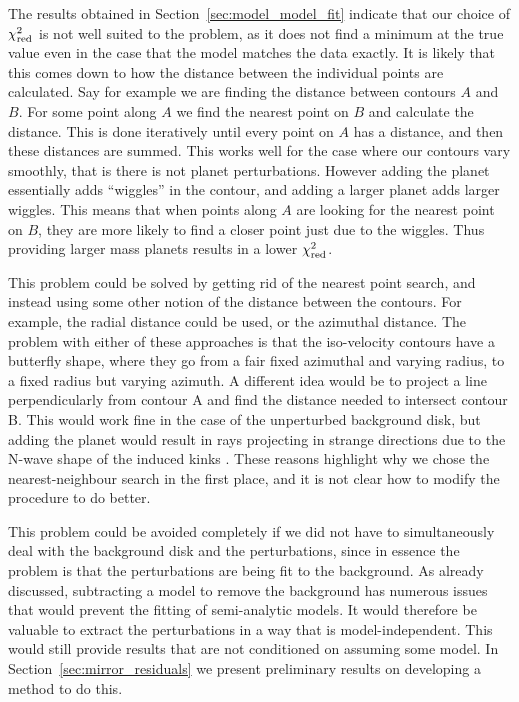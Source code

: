 The results obtained in Section~\ref{sec:model_model_fit} indicate that our choice of $\chi^2_{\rm red}$ is not well suited to the problem, as it does not find a minimum at the true value even in the case that the model matches the data exactly.
It is likely that this comes down to how the distance between the individual points are calculated.
Say for example we are finding the distance between contours $A$ and $B$.
For some point along $A$ we find the nearest point on $B$ and calculate the distance.
This is done iteratively until every point on $A$ has a distance, and then these distances are summed.
This works well for the case where our contours vary smoothly, that is there is not planet perturbations.
However adding the planet essentially adds ``wiggles'' in the contour, and adding a larger planet adds larger wiggles.
This means that when points along $A$ are looking for the nearest point on $B$, they are more likely to find a closer point just due to the wiggles.
Thus providing larger mass planets results in a lower $\chi^2_{\rm red}$.

This problem could be solved by getting rid of the nearest point search, and instead using some other notion of the distance between the contours. 
For example, the radial distance could be used, or the azimuthal distance.
The problem with either of these approaches is that the iso-velocity contours have a butterfly shape, where they go from a fair fixed azimuthal and varying radius, to a fixed radius but varying azimuth.
A different idea would be to project a line perpendicularly from contour A and find the distance needed to intersect contour B.
This would work fine in the case of the unperturbed background disk, but adding the planet would result in rays projecting in strange directions due to the N-wave shape of the induced kinks \citep{goodman2001,bollati2021a}.
These reasons highlight why we chose the nearest-neighbour search in the first place, and it is not clear how to modify the procedure to do better.

This problem could be avoided completely if we did not have to simultaneously deal with the background disk and the perturbations, since in essence the problem is that the perturbations are being fit to the background.
As already discussed, subtracting a model to remove the background has numerous issues that would prevent the fitting of semi-analytic models.
It would therefore be valuable to extract the perturbations in a way that is model-independent.
This would still provide results that are not conditioned on assuming some model.
In Section~\ref{sec:mirror_residuals} we present preliminary results on developing a method to do this.

